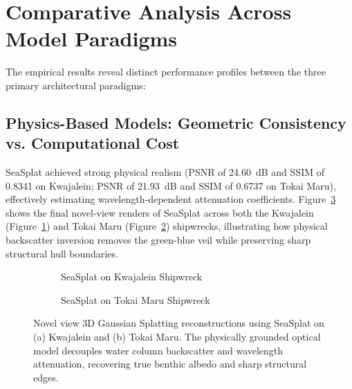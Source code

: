 \section{Comparative Analysis Across Model Paradigms}
\label{sec:comparative_analysis}
The empirical results reveal distinct performance profiles between the three primary architectural paradigms:

\subsection{Physics-Based Models: Geometric Consistency vs. Computational Cost}
SeaSplat achieved strong physical realism (PSNR of 24.60~dB and SSIM of 0.8341 on Kwajalein; PSNR of 21.93~dB and SSIM of 0.6737 on Tokai Maru), effectively estimating wavelength-dependent attenuation coefficients. Figure~\ref{fig:seasplat_renders} shows the final novel-view renders of SeaSplat across both the Kwajalein (Figure~\ref{fig:seasplat_kwaj}) and Tokai Maru (Figure~\ref{fig:seasplat_tokai}) shipwrecks, illustrating how physical backscatter inversion removes the green-blue veil while preserving sharp structural hull boundaries.

\begin{figure}[htbp]
    \centering
    \begin{subfigure}[b]{0.48\textwidth}
        \centering
        \caption{SeaSplat on Kwajalein Shipwreck}
        \label{fig:seasplat_kwaj}
    \end{subfigure}
    \hfill
    \begin{subfigure}[b]{0.48\textwidth}
        \centering
        \caption{SeaSplat on Tokai Maru Shipwreck}
        \label{fig:seasplat_tokai}
    \end{subfigure}
    \caption{Novel view 3D Gaussian Splatting reconstructions using SeaSplat on (a) Kwajalein and (b) Tokai Maru. The physically grounded optical model decouples water column backscatter and wavelength attenuation, recovering true benthic albedo and sharp structural edges.}
    \label{fig:seasplat_renders}
\end{figure}

